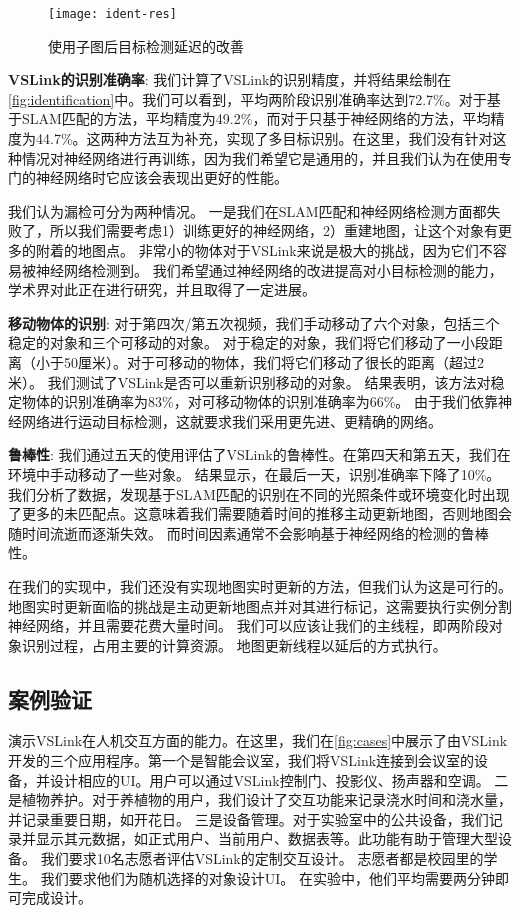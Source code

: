\begin{figure*}[t]
	\centering
	\texttt{[image: ident-res]}
	\caption{使用子图后目标检测延迟的改善}
	\label{fig:identification}
\end{figure*}

\textbf{VSLink的识别准确率}: 
我们计算了VSLink的识别精度，并将结果绘制在\autoref{fig:identification}中。我们可以看到，平均两阶段识别准确率达到72.7\%。对于基于SLAM匹配的方法，平均精度为49.2\%，而对于只基于神经网络的方法，平均精度为44.7\%。这两种方法互为补充，实现了多目标识别。在这里，我们没有针对这种情况对神经网络进行再训练，因为我们希望它是通用的，并且我们认为在使用专门的神经网络时它应该会表现出更好的性能。

我们认为漏检可分为两种情况。
一是我们在SLAM匹配和神经网络检测方面都失败了，所以我们需要考虑1）训练更好的神经网络，2）重建地图，让这个对象有更多的附着的地图点。
非常小的物体对于VSLink来说是极大的挑战，因为它们不容易被神经网络检测到。
我们希望通过神经网络的改进提高对小目标检测的能力，学术界对此正在进行研究，并且取得了一定进展。

\textbf{移动物体的识别}: 
对于第四次/第五次视频，我们手动移动了六个对象，包括三个稳定的对象和三个可移动的对象。
对于稳定的对象，我们将它们移动了一小段距离（小于50厘米）。对于可移动的物体，我们将它们移动了很长的距离（超过2米）。
我们测试了VSLink是否可以重新识别移动的对象。
结果表明，该方法对稳定物体的识别准确率为83\%，对可移动物体的识别准确率为66\%。
由于我们依靠神经网络进行运动目标检测，这就要求我们采用更先进、更精确的网络。


\textbf{鲁棒性}: 
我们通过五天的使用评估了VSLink的鲁棒性。在第四天和第五天，我们在环境中手动移动了一些对象。
结果显示，在最后一天，识别准确率下降了10\%。我们分析了数据，发现基于SLAM匹配的识别在不同的光照条件或环境变化时出现了更多的未匹配点。这意味着我们需要随着时间的推移主动更新地图，否则地图会随时间流逝而逐渐失效。
而时间因素通常不会影响基于神经网络的检测的鲁棒性。

在我们的实现中，我们还没有实现地图实时更新的方法，但我们认为这是可行的。地图实时更新面临的挑战是主动更新地图点并对其进行标记，这需要执行实例分割神经网络，并且需要花费大量时间。
我们可以应该让我们的主线程，即两阶段对象识别过程，占用主要的计算资源。
地图更新线程以延后的方式执行。

\subsection{案例验证}
演示VSLink在人机交互方面的能力。在这里，我们在\autoref{fig:cases}中展示了由VSLink开发的三个应用程序。第一个是智能会议室，我们将VSLink连接到会议室的设备，并设计相应的UI。用户可以通过VSLink控制门、投影仪、扬声器和空调。
二是植物养护。对于养植物的用户，我们设计了交互功能来记录浇水时间和浇水量，并记录重要日期，如开花日。
三是设备管理。对于实验室中的公共设备，我们记录并显示其元数据，如正式用户、当前用户、数据表等。此功能有助于管理大型设备。
我们要求10名志愿者评估VSLink的定制交互设计。
志愿者都是校园里的学生。
我们要求他们为随机选择的对象设计UI。
在实验中，他们平均需要两分钟即可完成设计。


